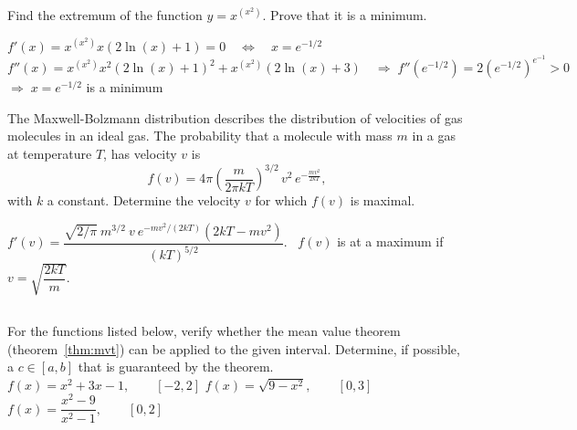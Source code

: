 \begin{Exercise}[difficulty = 2] Find the extremum of the function $y = x^{(x^2)}$. Prove that it is a minimum.

\end{Exercise}
\begin{Answer}\phantom{}
    $f'(x) = x^{(x^2)} x(2 \ln(x) + 1) = 0 \quad \Leftrightarrow \quad x = e^{-1/2}$ \\[0.2cm]
	$f''(x) = x^{(x^2)} x^2 (2 \ln(x) + 1)^2 + x^{(x^2)} (2 \ln(x) + 3) \quad \Rightarrow \; f''\left( e^{-1/2} \right) = 2 \left( e^{-1/2} \right)^{e^{-1}} >0 $ \\[0.2cm]
	$\Rightarrow \; x = e^{-1/2}$ is a minimum
\end{Answer}
\begin{Exercise}[difficulty = 2] The Maxwell-Bolzmann distribution describes the distribution of velocities of gas molecules in an ideal gas. The probability that a molecule with mass $m$ in a gas at temperature $T$, has velocity $v$ is
\[ f(v) = 4\pi\left(\dfrac{m}{2\pi kT}\right)^{3/2}\,v^2\,e^{-\frac{mv^2}{2kT}}, \]
with $k$ a constant. Determine the velocity $v$ for which $f(v)$ is maximal.

\end{Exercise}

\begin{Answer}\phantom{}
$f'(v) = \dfrac{\sqrt{2/\pi}\ m^{3/2}\ v \ e^{-mv^2/(2kT)} \left(2kT-mv^2\right)}{\left(kT\right)^{5/2}}$. \  $f(v)$ is at a maximum if $v=\sqrt{\dfrac{2kT}{m}}$.
\end{Answer}

\subsection*{}
\begin{Exercise} For the functions listed below, verify whether the mean value theorem (theorem~\ref{thm:mvt}) can be applied to the given interval. Determine, if possible, a $c \in [a,b]$ that is guaranteed by the theorem. 
    \Question[difficulty = 2] $f(x) = x^2+3x-1, \qquad [-2,2] $
    \Question[difficulty = 2] $f(x) = \sqrt{9-x^2}, \qquad [0,3] $ 
    \Question[difficulty = 2] $f(x) = \dfrac{x^2-9}{x^2-1}, \qquad [0,2] $ 
    
\end{Exercise}

